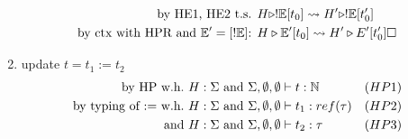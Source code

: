 \documentclass{article}
\begin{document}
\begin{enumerate}
\begin{align*}
            \text{by HE1, HE2 t.s. } & H\triangleright !\mathbb{E}[t_0] \leadsto H'\triangleright !\mathbb{E}[t_0'] \\
            \text{by ctx with HPR and $\mathbb{E}'=[!\mathbb{E}]$: } & H\triangleright \mathbb{E}'[t_0] \leadsto H'\triangleright E'[t_0']\square
        \end{align*}
    \item update $t=t_1:=t_2$
        \begin{align*}
            \text{by HP w.h.} &\ H:\Sigma \text{ and } \Sigma,\emptyset,\emptyset\vdash t:\mathbb N & (HP1)\\
            \text{by typing of := w.h.} &\ H:\Sigma \text{ and } \Sigma,\emptyset,\emptyset\vdash t_1:ref(\tau) & (HP2) \\
            \text{and} &\ H:\Sigma \text{ and } \Sigma,\emptyset,\emptyset\vdash t_2:\tau & (HP3) \\
        \end{align*}
\end{enumerate}

\newpage
\end{document}
